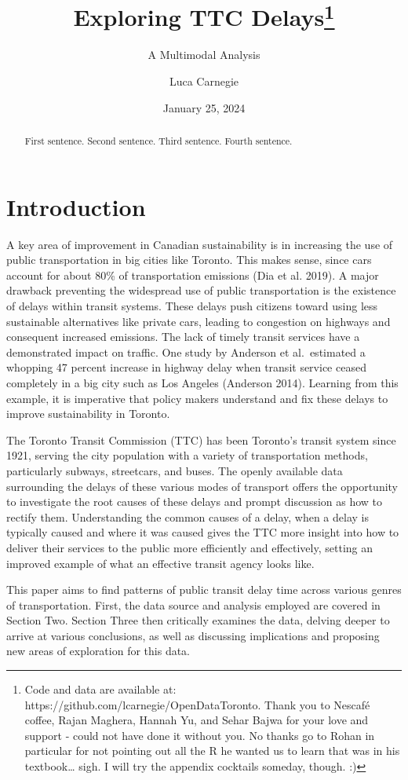 \documentclass[
  letterpaper,
  DIV=11,
  numbers=noendperiod]{scrartcl}
\title{Exploring TTC Delays\thanks{Code and data are available at:
https://github.com/lcarnegie/OpenDataToronto. Thank you to Nescafé
coffee, Rajan Maghera, Hannah Yu, and Sehar Bajwa for your love and
support - could not have done it without you. No thanks go to Rohan in
particular for not pointing out all the R he wanted us to learn that was
in his textbook\ldots{} sigh. I will try the appendix cocktails someday,
though. :)}}
\subtitle{A Multimodal Analysis}
\author{Luca Carnegie}
\date{January 25, 2024}
\begin{document}
\maketitle
\begin{abstract}
First sentence. Second sentence. Third sentence. Fourth sentence.
\end{abstract}

\section{Introduction}\label{introduction}

A key area of improvement in Canadian sustainability is in increasing
the use of public transportation in big cities like Toronto. This makes
sense, since cars account for about 80\% of transportation emissions
(Dia et al. 2019). A major drawback preventing the widespread use of
public transportation is the existence of delays within transit systems.
These delays push citizens toward using less sustainable alternatives
like private cars, leading to congestion on highways and consequent
increased emissions. The lack of timely transit services have a
demonstrated impact on traffic. One study by Anderson et al.~estimated a
whopping 47 percent increase in highway delay when transit service
ceased completely in a big city such as Los Angeles (Anderson 2014).
Learning from this example, it is imperative that policy makers
understand and fix these delays to improve sustainability in Toronto.

The Toronto Transit Commission (TTC) has been Toronto's transit system
since 1921, serving the city population with a variety of transportation
methods, particularly subways, streetcars, and buses. The openly
available data surrounding the delays of these various modes of
transport offers the opportunity to investigate the root causes of these
delays and prompt discussion as how to rectify them. Understanding the
common causes of a delay, when a delay is typically caused and where it
was caused gives the TTC more insight into how to deliver their services
to the public more efficiently and effectively, setting an improved
example of what an effective transit agency looks like.

This paper aims to find patterns of public transit delay time across
various genres of transportation. First, the data source and analysis
employed are covered in Section Two. Section Three then critically
examines the data, delving deeper to arrive at various conclusions, as
well as discussing implications and proposing new areas of exploration
for this data.
\end{document}
